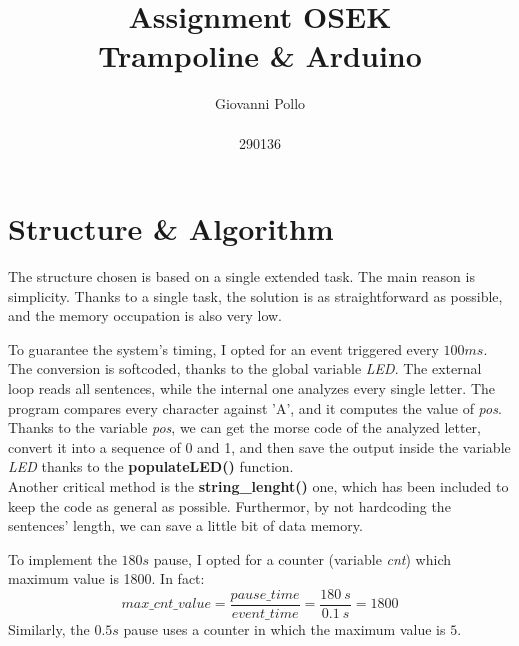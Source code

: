 \documentclass[a4paper]{article}
\title{\Huge Assignment OSEK \\ \LARGE Trampoline \& Arduino}
\author{\huge Giovanni Pollo \\ \\ \huge 290136}
\date{}
\begin{document}
\begin{titlepage}
  \centering
  \vspace{2px}
\end{titlepage}
\maketitle




\newpage


\section{Structure \& Algorithm}
The structure chosen is based on a single extended task. The main reason is simplicity. Thanks to a single task, the solution is as straightforward as possible, and the memory occupation is also very low.
\newline

To guarantee the system's timing, I opted for an event triggered every \(100ms\). \\
The conversion is softcoded, thanks to the global variable \emph{LED}. The external loop reads all sentences, while the internal one analyzes every single letter. The program compares every character against 'A', and it computes the value of \emph{pos}. \\
Thanks to the variable \emph{pos}, we can get the morse code of the analyzed letter, convert it into a sequence of 0 and 1, and then save the output inside the variable \emph{LED} thanks to the \textbf{populateLED()} function. \\
Another critical method is the \textbf{string\_lenght()} one, which has been included to keep the code as general as possible. Furthermor, by not hardcoding the sentences' length, we can save a little bit of data memory.
\newline

To implement the \(180s\) pause, I opted for a counter (variable \emph{cnt}) which maximum value is 1800. In fact:
\begin{equation}
  max\_cnt\_value = \frac{pause\_time}{event\_time} = \frac{180\ s}{0.1\ s} = 1800
\end{equation}
Similarly, the \(0.5s\) pause uses a counter in which the maximum value is \(5\).
\newline
\end{document}
